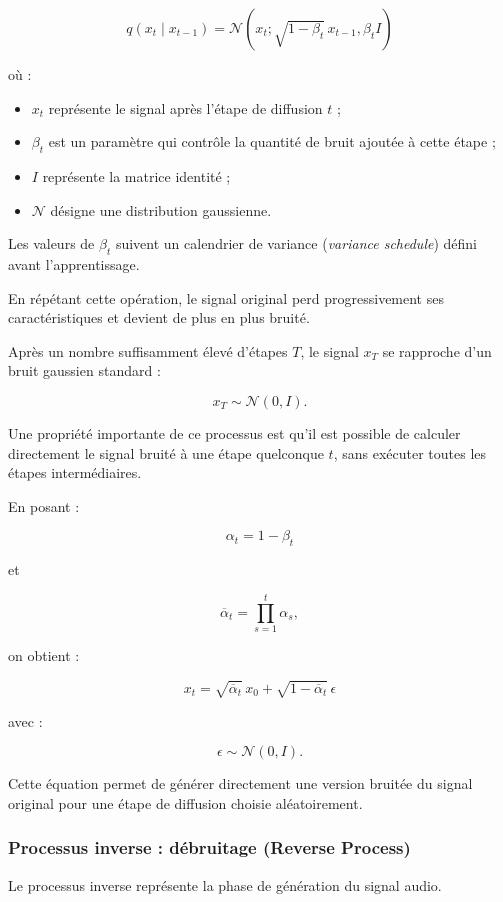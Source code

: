 \[
q(x_t \mid x_{t-1}) =
\mathcal{N}\left(
x_t;
\sqrt{1-\beta_t}\,x_{t-1},
\beta_t I
\right)
\]

où :

\begin{itemize}
    \item $x_t$ représente le signal après l'étape de diffusion
    $t$ ;
    \item $\beta_t$ est un paramètre qui contrôle la quantité
    de bruit ajoutée à cette étape ;
    \item $I$ représente la matrice identité ;
    \item $\mathcal{N}$ désigne une distribution gaussienne.
\end{itemize}

Les valeurs de $\beta_t$ suivent un calendrier de variance
(\textit{variance schedule}) défini avant l'apprentissage.

En répétant cette opération, le signal original perd
progressivement ses caractéristiques et devient de plus
en plus bruité.

Après un nombre suffisamment élevé d'étapes $T$, le signal
$x_T$ se rapproche d'un bruit gaussien standard :

\[
x_T \sim \mathcal{N}(0,I).
\]

Une propriété importante de ce processus est qu'il est
possible de calculer directement le signal bruité à une
étape quelconque $t$, sans exécuter toutes les étapes
intermédiaires.

En posant :

\[
\alpha_t=1-\beta_t
\]

et

\[
\overline{\alpha}_t=
\prod_{s=1}^{t}\alpha_s,
\]

on obtient :

\[
\boxed{
x_t =
\sqrt{\overline{\alpha}_t}\,x_0
+
\sqrt{1-\overline{\alpha}_t}\,\epsilon
}
\]

avec :

\[
\epsilon\sim\mathcal{N}(0,I).
\]

Cette équation permet de générer directement une version
bruitée du signal original pour une étape de diffusion
choisie aléatoirement.

\subsubsection{Processus inverse : débruitage
(Reverse Process)}

Le processus inverse représente la phase de génération
du signal audio.

